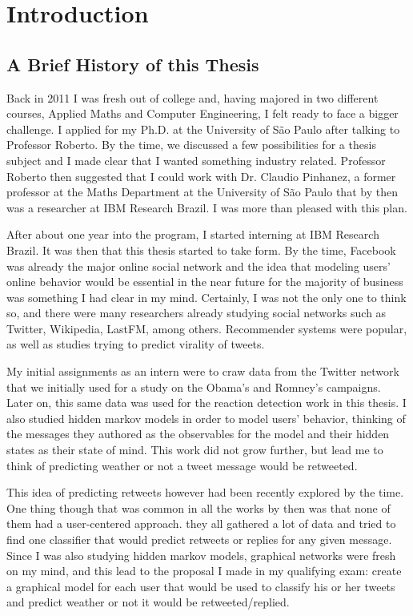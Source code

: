 \chapter{Introduction}

\section{A Brief History of this Thesis}

Back in 2011 I was fresh out of college and, having majored in two different courses, Applied Maths and Computer Engineering, I felt ready to face a bigger challenge. I applied for my Ph.D. at the University of São Paulo after talking to Professor Roberto. By the time, we discussed a few possibilities for a thesis subject and I made clear that I wanted something industry related. Professor Roberto then suggested that I could work with Dr. Claudio Pinhanez, a former professor at the Maths Department at the University of São Paulo that by then was a researcher at IBM Research Brazil. I was more than pleased with this plan.

After about one year into the program, I started interning at IBM Research Brazil. It was then that this thesis started to take form. By the time, Facebook was already the major online social network and the idea that modeling users' online behavior would be essential in the near future for the majority of business was something I had clear in my mind. Certainly, I was not the only one to think so, and there were many researchers already studying social networks such as Twitter, Wikipedia, LastFM, among others. Recommender systems were popular, as well as studies trying to predict virality of tweets. 

My initial assignments as an intern were to craw data from the Twitter network that we initially used for a study on the Obama's and Romney's campaigns. Later on, this same data was used for the reaction detection work in this thesis. I also studied hidden markov models in order to model users' behavior, thinking of the messages they authored as the observables for the model and their hidden states as their state of mind. This work did not grow further, but lead me to think of predicting weather or not a tweet message would be retweeted.

This idea of predicting retweets however had been recently explored by the time. One thing though that was common in all the works by then was that none of them had a user-centered approach. they all gathered a lot of data and tried to find one classifier that would predict retweets or replies for any given message. Since I was also studying hidden markov models, graphical networks were fresh on my mind, and this lead to the proposal I made in my qualifying exam: create a graphical model for each user that would be used to classify his or her tweets and predict weather or not it would be retweeted/replied. 

